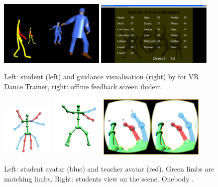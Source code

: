 \begin{figure}
	\centering
	\includegraphics[width=0.45\textwidth]{img/VRDanceTrainerPractice.png}
	\includegraphics[width=0.5\textwidth]{img/VRDanceTrainerScoreBoard.png}
	\caption{Left: student (left) and guidance visualisation (right) by \cite{Chan2010} for VR Dance Trainer, right: offline feedback screen ibidem.}
	\label{fig:vrdt}
\end{figure}
\newpage
\begin{figure}[h]
	\centering
	\includegraphics[width=0.225\textwidth]{img/onebody1.png}
	\includegraphics[width=0.225\textwidth]{img/onebody2.png}
	\includegraphics[width=0.45\textwidth]{img/onebody3.png}
	\caption{Left: student avatar (blue) and teacher avatar (red). Green limbs are matching limbs. Right: students view on the scene. Onebody \cite{Hoang2016}.}
	\label{fig:ob1}
\end{figure}

